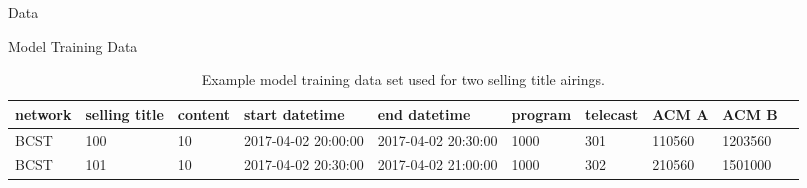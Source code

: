 \begin{chapter}{Data}
\begin{section}{Model Training Data}
  \begin{table}[h!]
    \begin{adjustbox}{width=1.1\textwidth,center=\textwidth}
      \large
      \begin{tabular}{llllllllll}
        network & selling title & content & start datetime & end datetime & program & telecast & ACM A & ACM B\\
        \hline
        BCST & 100 & 10 & 2017-04-02 20:00:00 & 2017-04-02 20:30:00 & 1000 & 301 & 110560 & 1203560\\
        BCST & 101 & 10 & 2017-04-02 20:30:00 & 2017-04-02 21:00:00 & 1000 & 302 & 210560 & 1501000\\
      \end{tabular}
    \end{adjustbox}
    \caption{Example model training data set used for two selling title airings.}\label{tab:data}
  \end{table}


\end{section}

\end{chapter}